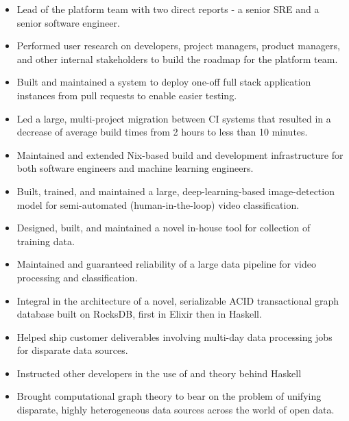 \documentclass[10pt,a4paper,sans]{moderncv}        %
\begin{document}
{\begin{itemize}
   \item Lead of the platform team with two direct reports - a senior SRE and
     a senior software engineer.
   \item Performed user research on developers, project managers, product
     managers, and other internal stakeholders to build the roadmap for the
     platform team.
   \item Built and maintained a system to deploy one-off full stack
     application instances from pull requests to enable easier testing.
   \item Led a large, multi-project migration between CI systems that resulted
     in a decrease of average build times from 2 hours to less than 10 minutes.
   \item Maintained and extended Nix-based build and development
     infrastructure for both software engineers and machine learning engineers.
 \end{itemize}}
{\begin{itemize}
   \item Built, trained, and maintained a large, deep-learning-based
     image-detection model for semi-automated (human-in-the-loop) video
     classification.
   \item Designed, built, and maintained a novel in-house tool for collection of
     training data.
   \item Maintained and guaranteed reliability of a large data pipeline for
     video processing and classification.
 \end{itemize}}
{\begin{itemize}
   \item Integral in the architecture of a novel, serializable ACID
     transactional graph database built on RocksDB, first in Elixir then in
     Haskell.
   \item Helped ship customer deliverables involving multi-day data
     processing jobs for disparate data sources.
   \item Instructed other developers in the use of and theory behind Haskell
   \item Brought computational graph theory to bear on the problem of unifying
     disparate, highly heterogeneous data sources across the world of open data.
 \end{itemize}}
\end{document}
